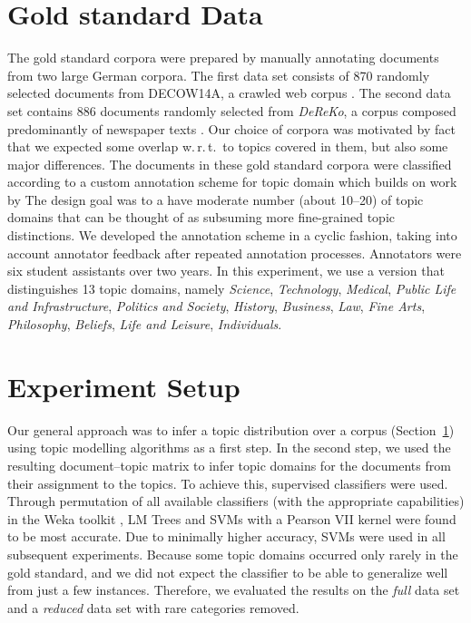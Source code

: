 \documentclass[11pt]{article}
\begin{document}
\section{Gold standard Data}
\label{sec:goldstandard}

The gold standard corpora were prepared by manually annotating documents from two large German corpora.
The first data set consists of 870 randomly selected documents from DECOW14A, a crawled web corpus \cite{SchaeferBildhauer2012a,Schaefer2015b}.
The second data set contains 886 documents randomly selected from \textit{DeReKo}, a corpus composed predominantly of newspaper texts \cite{KupietzEa2010}. 
Our choice of corpora was motivated by fact that we expected some overlap w.\,r.\,t.\ to topics covered in them, but also some major differences. 
The documents in these gold standard corpora were classified according to a custom annotation scheme for topic domain which builds on work by \cite{Sharoff2006}
The design goal was to a have moderate number (about 10--20) of topic domains that can be thought of as subsuming more fine-grained topic distinctions.
We developed the annotation scheme in a cyclic fashion, taking into account annotator feedback after repeated annotation processes.
Annotators were six student assistants over two years.
In this experiment, we use a version that distinguishes 13 topic domains, namely \textit{Science}, \textit{Technology}, \textit{Medical}, \textit{Public Life and Infrastructure}, \textit{Politics and Society}, \textit{History}, \textit{Business}, \textit{Law}, \textit{Fine Arts},  \textit{Philosophy}, \textit{Beliefs},  \textit{Life and Leisure}, \textit{Individuals}.

\section{Experiment Setup}
\label{sec:experiment}

Our general approach was to infer a topic distribution over a corpus (Section~\ref{sec:goldstandard}) using topic modelling algorithms as a first step.
In the second step, we used the resulting document--topic matrix to infer topic domains for the documents from their assignment to the topics.
To achieve this, supervised classifiers were used.
Through permutation of all available classifiers (with the appropriate capabilities) in the Weka toolkit \cite{HallWitten2011}, LM Trees \cite{LandwehrEa2005} and SVMs with a Pearson VII kernel \cite{UstunEa2006} were found to be most accurate.
Due to minimally higher accuracy, SVMs were used in all subsequent experiments.
Because some topic domains occurred only rarely in the gold standard, and we did not expect the classifier to be able to generalize well from just a few instances.
Therefore, we evaluated the results on the \textit{full} data set and a \textit{reduced} data set with rare categories removed.
\end{document}
